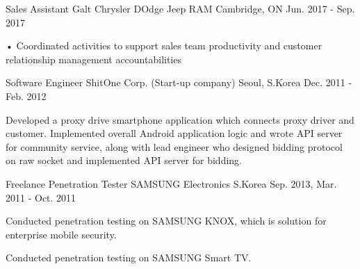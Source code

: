 \begin{cventries}
\cventry
{Sales Assistant} %
{Galt Chrysler DOdge Jeep RAM} %
{Cambridge, ON} %
{Jun. 2017 - Sep. 2017} %
{ %
\begin{cvitems}
\item {• Coordinated activities to support sales team productivity and customer relationship management accountabilities}
\end{cvitems}
}


\cventry
{Software Engineer} %
{ShitOne Corp. (Start-up company)} %
{Seoul, S.Korea} %
{Dec. 2011 - Feb. 2012} %
{ %
\begin{cvitems}
\item {Developed a proxy drive smartphone application which connects proxy driver and customer. Implemented overall Android application logic and wrote API server for community service, along with lead engineer who designed bidding protocol on raw socket and implemented API server for bidding.}
\end{cvitems}
}


\cventry
{Freelance Penetration Tester} %
{SAMSUNG Electronics} %
{S.Korea} %
{Sep. 2013, Mar. 2011 - Oct. 2011} %
{ %
\begin{cvitems}
\item {Conducted penetration testing on SAMSUNG KNOX, which is solution for enterprise mobile security.}
\item {Conducted penetration testing on SAMSUNG Smart TV.}
\end{cvitems}
}


\end{cventries}